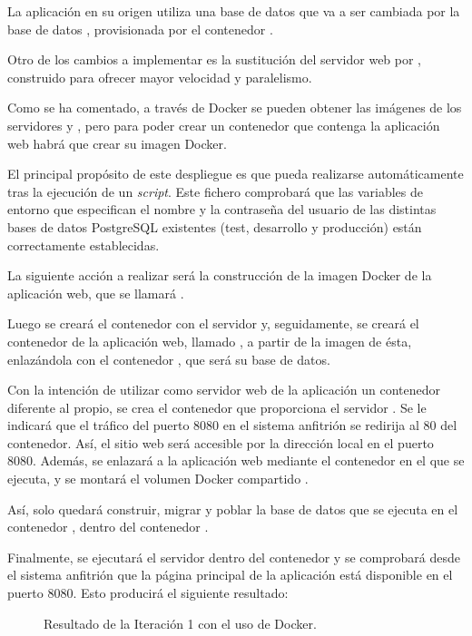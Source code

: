 La aplicación en su origen utiliza una base de datos  que va a ser cambiada por la base de datos , provisionada por el contenedor . 

Otro de los cambios a implementar es la sustitución del servidor web  por , construido para ofrecer mayor velocidad y paralelismo.

Como se ha comentado, a través de Docker se pueden obtener las imágenes de los servidores  y , pero para poder crear un contenedor que contenga la aplicación web habrá que crear su imagen Docker. 

El principal propósito de este despliegue es que pueda realizarse automáticamente tras la ejecución de un \textit{script}. Este fichero comprobará que las variables de entorno que especifican el nombre y la contraseña del usuario de las distintas bases de datos PostgreSQL existentes (test, desarrollo y producción) están correctamente establecidas.

La siguiente acción a realizar será la construcción de la imagen Docker de la aplicación web, que se llamará . 

Luego se creará el contenedor  con el servidor  y, seguidamente, se creará el contenedor de la aplicación web, llamado , a partir de la imagen de ésta, enlazándola con el contenedor , que será su base de datos.

Con la intención de utilizar como servidor web de la aplicación un contenedor diferente al propio, se crea el contenedor  que proporciona el servidor . Se le indicará que el tráfico del puerto 8080 en el sistema anfitrión se redirija al 80 del contenedor. Así, el sitio web será accesible por la dirección local en el puerto 8080. Además, se enlazará a la aplicación web mediante el contenedor en el que se ejecuta, y se montará el volumen Docker compartido .

Así, solo quedará construir, migrar y poblar la base de datos que se ejecuta en el contenedor , dentro del contenedor .

Finalmente, se ejecutará el servidor  dentro del contenedor  y se comprobará desde el sistema anfitrión que la página principal de la aplicación  está disponible en el puerto 8080. Esto producirá el siguiente resultado:
\begin{figure}[H]
\caption{Resultado de la Iteración 1 con el uso de Docker.\label{fig:figure_placement_example}}
\end{figure}

